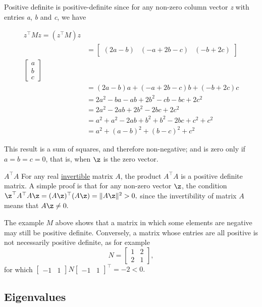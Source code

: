 {{{{{{{{{\begin{example}{Positive definite}
is positive-definite since for any non-zero column vector \emph{z} with
entries \emph{a}, \emph{b} and \emph{c}, we have

\begin{align}
z^\top  M z=\left(z^\top M\right)z\\
&=\begin{bmatrix}(2a-b)&(-a+2b-c)&(-b+2c)\end{bmatrix}\\
\begin{bmatrix}a\\b\\c\end{bmatrix}\\
&=(2a-b)a+(-a+2b-c)b+(-b+2c)c\\
&=2a^2-ba-ab+2b^2-cb-bc+2c^2\\
&=2a^2-2ab+2b^2-2bc+2c^2\\
&=a^2+a^2-2ab+b^2+b^2-2bc+c^2+c^2\\
&=a^2+(a-b)^2+(b-c)^2+c^2
\end{align}

This result is a sum of squares, and therefore non-negative; and is zero
only if \(a = b = c = 0\), that is, when $\z$ is the zero vector.
\end{example}

\begin{example}{$A^\top A$}
For any real \href{Invertible_matrix}{invertible} matrix
\(A\), the product \(A^\top  A\) is a positive definite matrix. A
simple proof is that for any non-zero vector \(\z\), the condition
\(\z^\top  A^\top  A\z = (A\z)^\top  (A\z) = \|A\z\|^2 > 0,\)
since the invertibility of matrix \(A\) means that \(A\z \neq 0.\)

The example \(M\) above shows that a matrix in which some
elements are negative may still be positive definite. Conversely, a
matrix whose entries are all positive is not necessarily positive
definite, as for example
\[N = \begin{bmatrix} 1 & 2 \\ 2 & 1 \end{bmatrix},\]
for which
\(\begin{bmatrix} -1 & 1 \end{bmatrix}N\begin{bmatrix} -1 & 1 \end{bmatrix}^\top  = -2 < 0.\)
\end{example}

\hypertarget{eigenvalues}{%
\subsection{Eigenvalues}\label{eigenvalues}}

}}}}}}}}}
